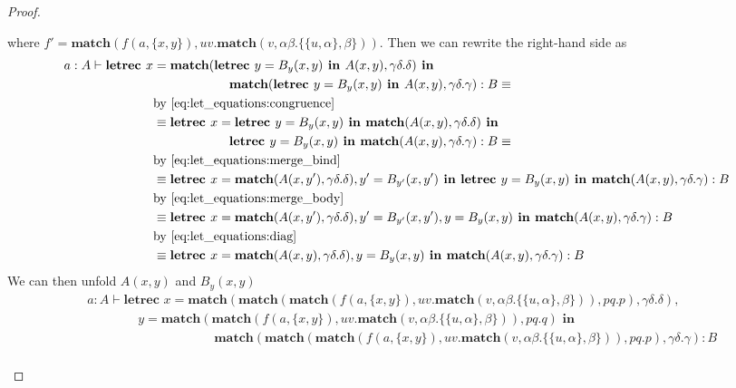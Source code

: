 \begin{example}
\begin{proof}
\begin{itemize}
where $f' = \textbf{match}(f(a,\{x,y\}), uv.\textbf{match}(v,\alpha\beta.\{\{u,\alpha\}, \beta\}))$.
Then we can rewrite the right-hand side as
\begin{align*}
a : A \vdash \textbf{letrec } x &= \textbf{match}(\textbf{letrec } y = B_{y}(x,y) \textbf{ in } A(x,y), \gamma\delta.\delta) \textbf{ in }\\
&\hspace{6em}\textbf{match}(\textbf{letrec } y = B_{y}(x,y) \textbf{ in } A(x,y), \gamma\delta.\gamma) : B \equiv\\
&\text{by \cref{eq:let_equations:congruence}}\\
&\equiv \textbf{letrec } x = \textbf{letrec } y = B_{y}(x,y) \textbf{ in } \textbf{match}(A(x,y),\gamma\delta.\delta) \textbf{ in }\\
&\hspace{6em} \textbf{letrec } y = B_{y}(x,y) \textbf{ in } \textbf{match}(A(x,y),\gamma\delta.\gamma) : B \equiv\\
&\text{by \cref{eq:let_equations:merge_bind}}\\
&\equiv \textbf{letrec } x = \textbf{match}(A(x,y'), \gamma\delta.\delta), y' = B_{y'}(x,y') \textbf{ in } \textbf{letrec } y = B_{y}(x,y) \textbf{ in } \textbf{match}(A(x,y), \gamma\delta.\gamma) : B\\
&\text{by \cref{eq:let_equations:merge_body}}\\
&\equiv \textbf{letrec } x = \textbf{match}(A(x,y'), \gamma\delta.\delta), y' = B_{y'}(x,y'), y = B_{y}(x,y) \textbf{ in } \textbf{match}(A(x,y), \gamma\delta.\gamma) : B\\
&\text{by \cref{eq:let_equations:diag}}\\
&\equiv \textbf{letrec } x = \textbf{match}(A(x,y), \gamma\delta.\delta), y = B_{y}(x,y) \textbf{ in } \textbf{match}(A(x,y), \gamma\delta.\gamma) : B
\end{align*}
We can then unfold $A(x,y)$ and $B_y(x,y)$
\begin{align*}
&a : A \vdash \textbf{letrec } x = \textbf{match}(\textbf{match}(\textbf{match}(f(a,\{x,y\}), uv.\textbf{match}(v, \alpha\beta.\{\{u,\alpha\},\beta\})), pq.p), \gamma\delta.\delta),\\
&\hspace{4em} y = \textbf{match}(\textbf{match}(f(a,\{x,y\}), uv.\textbf{match}(v, \alpha\beta.\{\{u,\alpha\},\beta\})), pq.q) \textbf{ in }\\
&\hspace{10em} \textbf{match}(\textbf{match}(\textbf{match}(f(a,\{x,y\}), uv.\textbf{match}(v, \alpha\beta.\{\{u,\alpha\},\beta\})), pq.p), \gamma\delta.\gamma) : B\\

\end{align*}
\end{itemize}
\end{proof}
\end{example}
